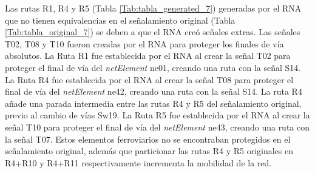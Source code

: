      Las rutas R1, R4 y R5 (Tabla \ref{Tab:tabla_generated_7}) generadas por el RNA que no tienen equivalencias en el señalamiento original (Tabla \ref{Tab:tabla_original_7}) se deben a que el RNA creó señales extras. Las señales T02, T08 y T10 fueron creadas por el RNA para proteger los finales de vía absolutos. La Ruta R1 fue establecida por el RNA al crear la señal T02 para proteger el final de vía del \textit{netElement} ne01, creando una ruta con la señal S14. La Ruta R4 fue establecida por el RNA al crear la señal T08 para proteger el final de vía del \textit{netElement} ne42, creando una ruta con la señal S14. La ruta R4 añade una parada intermedia entre las rutas R4 y R5 del señalamiento original, previo al cambio de vías Sw19. La Ruta R5 fue establecida por el RNA al crear la señal T10 para proteger el final de vía del \textit{netElement} ne43, creando una ruta con la señal T07. Estos elementos ferroviarios no se encontraban protegidos en el señalamiento original, además que particionar las rutas R4 y R5 originales en R4+R10 y R4+R11 respectivamente incrementa la mobilidad de la red.